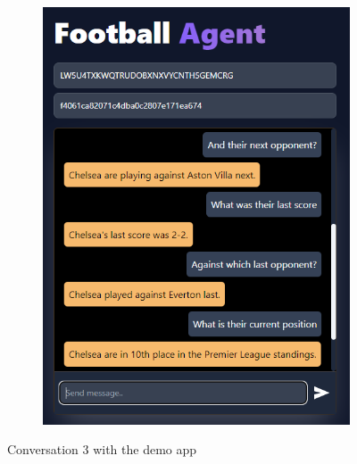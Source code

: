 \documentclass[10pt,a4paper,twocolumn]{article}
\begin{document}
\begin{figure}
\begin{subfigure}[b]{0.48\textwidth}
        \includegraphics[width=\textwidth]{assets/Screenshot_8.png}
    \end{subfigure}
    \caption*{Conversation 3 with the demo app}
\end{figure}
\end{document}
